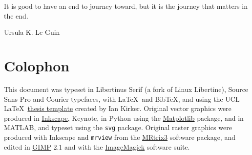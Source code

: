 \documentclass[12pt,phd,a4paper,oneside,draft]{ucl_thesis}
\begin{document}
\epigraph{It is good to have an end to journey toward, but it is the journey that matters in the end.}{Ursula K. Le Guin}




\printbibliography

\chapter*{Colophon}

This document was typeset in Libertinus Serif (a fork of Linux Libertine), {\sffamily Source Sans Pro} and {\ttfamily Courier} typefaces, with \LaTeX\ and Bib\TeX, and using the UCL \LaTeX\ \href{https://github.com/UCL/ucl-latex-thesis-templates}{thesis template} created by Ian Kirker.
Original vector graphics were produced in \href{https://inkscape.org/}{Inkscape}, Keynote, in Python using the \href{https://matplotlib.org/}{Matplotlib} package, and in MATLAB, and typeset using the \verb|svg| package.
Original raster graphics were produced with Inkscape and \verb|mrview| from the \href{https://www.mrtrix.org/}{MRtrix3} software package, and edited in \href{https://www.gimp.org/}{GIMP} 2.1 and with the \href{https://imagemagick.org/index.php}{ImageMagick} software suite.

\end{document}
